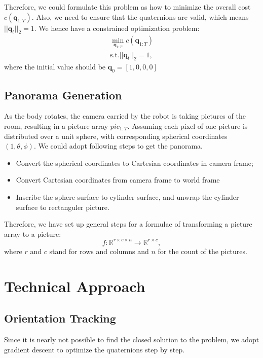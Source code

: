 \documentclass[conference]{IEEEtran}
\begin{document}
Therefore, we could formulate this problem as how to minimize the overall cost $c(\boldsymbol{q}_{1:T})$. Also, we need to ensure
that the quaternions are valid, which means $||\boldsymbol{q}_t||_2 = 1$. We hence have a constrained optimization problem:
\begin{equation}
    \begin{aligned}
        \min\limits_{\boldsymbol{q}_{1:T}} c(\boldsymbol{q}_{1:T}) \\
        \text{s.t.} ||\boldsymbol{q}_t||_2 = 1,
    \end{aligned}
\end{equation}
where the initial value should be $\boldsymbol{q}_0 = [1, 0, 0, 0]$

\subsection{Panorama Generation}
As the body rotates, the camera carried by the robot is taking pictures of the room, resulting in a picture array $pic_{1:T}$.
Assuming each pixel of one picture is distributed over a unit sphere, with corresponding spherical coordinates $(1, \theta,
    \phi)$. We could adopt following steps to get the panorama.
\begin{itemize}
    \item Convert the spherical coordinates to Cartesian coordinates in camera frame;
    \item Convert Cartesian coordinates from camera frame to world frame
    \item Inscribe the sphere surface to cylinder surface, and unwrap the cylinder surface to rectanguler picture.
\end{itemize}


Therefore, we have set up general steps for a formulae of transforming a picture array to a picture:
\begin{equation}
    f: \mathbb{R}^{r \times c \times n} \rightarrow \mathbb{R}^{r \times c},
\end{equation}
where $r$ and $c$ stand for rows and columns and $n$ for the count of the pictures.


\section{Technical Approach}
\subsection{Orientation Tracking}
Since it is nearly not possible to find the closed solution to the problem, we adopt gradient descent to optimize the
quaternions step by step.
\end{document}
